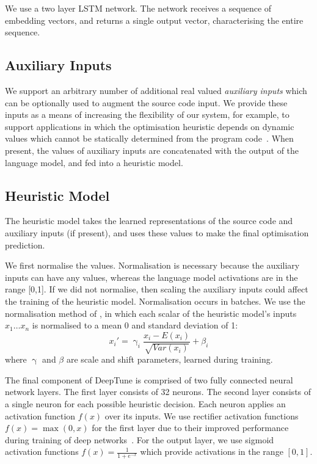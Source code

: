 We use a two layer LSTM network. The network receives a sequence of embedding vectors, and returns a single output vector, characterising the entire sequence.


\subsection{Auxiliary Inputs}

We support an arbitrary number of additional real valued \emph{auxiliary inputs} which can be optionally used to augment the source code input. We provide these inputs as a means of increasing the flexibility of our system, for example, to support applications in which the optimisation heuristic depends on dynamic values which cannot be statically determined from the program code~\cite{Ding2015,Stephenson2005}. When present, the values of auxiliary inputs are concatenated with the output of the language model, and fed into a heuristic model.


\subsection{Heuristic Model}

The heuristic model takes the learned representations of the source code and auxiliary inputs (if present), and uses these values to make the final optimisation prediction.

We first normalise the values. Normalisation is necessary because the auxiliary inputs can have any values, whereas the language model activations are in the range [0,1]. If we did not normalise, then scaling the auxiliary inputs could affect the training of the heuristic model. Normalisation occurs in batches. We use the normalisation method of%
, in which each scalar of the heuristic model's inputs $x_1 \ldots x_n$ is normalised to a mean 0 and standard deviation of 1:
%
\begin{equation}
x_i' = \upgamma_i \frac{x_i - E(x_i)}{\sqrt{Var(x_i)}} + \beta_i
\end{equation}
%
where $\upgamma$ and $\beta$ are scale and shift parameters, learned during training.

The final component of DeepTune is comprised of two fully connected neural network layers. The first layer consists of 32 neurons. The second layer consists of a single neuron for each possible heuristic decision. Each neuron applies an activation function $f(x)$ over its inputs. We use rectifier activation functions $f(x) = \max(0, x)$ for the first layer due to their improved performance during training of deep networks~\cite{Nair2010}. For the output layer, we use sigmoid activation functions $f(x) = \frac{1}{1+e^{-x}}$ which provide activations in the range $[0,1]$.

